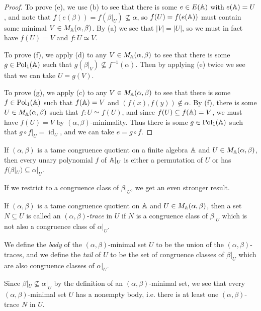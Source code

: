 \begin{appendices}
\begin{proof}
To prove (e), we use (b) to see that there is some $e \in E(\mathbb{A})$ with $e(\mathbb{A}) = U$, and note that $f(e(\beta)) = f(\beta|_U) \not\subseteq \alpha$, so $f(U) = f(e(\mathbb{A}))$ must contain some minimal $V \in M_{\mathbb{A}}(\alpha,\beta)$. By (a) we see that $|V| = |U|$, so we must in fact have $f(U) = V$ and $f : U \simeq V$.

To prove (f), we apply (d) to any $V \in M_{\mathbb{A}}(\alpha, \beta)$ to see that there is some $g \in \operatorname{Pol}_1(\mathbb{A})$ such that $g(\beta|_V) \not\subseteq f^{-1}(\alpha)$. Then by applying (e) twice we see that we can take $U = g(V)$.

To prove (g), we apply (c) to any $V \in M_{\mathbb{A}}(\alpha, \beta)$ to see that there is some $f \in \operatorname{Pol}_1(\mathbb{A})$ such that $f(\mathbb{A}) = V$ and $(f(x), f(y)) \not\in \alpha$. By (f), there is some $U \in M_{\mathbb{A}}(\alpha, \beta)$ such that $f : U \simeq f(U)$, and since $f(U) \subseteq f(\mathbb{A}) = V$, we must have $f(U) = V$ by $(\alpha,\beta)$-minimality. Thus there is some $g \in \operatorname{Pol}_1(\mathbb{A})$ such that $g\circ f|_U = \operatorname{id}_U$, and we can take $e = g \circ f$.
\end{proof}

\begin{cor} If $(\alpha,\beta)$ is a tame congruence quotient on a finite algebra $\mathbb{A}$ and $U \in M_{\mathbb{A}}(\alpha,\beta)$, then every unary polynomial $f$ of $\mathbb{A}|_U$ is either a permutation of $U$ or has $f(\beta|_U) \subseteq \alpha|_U$.
\end{cor}

If we restrict to a congruence class of $\beta|_U$, we get an even stronger result.

\begin{defn} If $(\alpha,\beta)$ is a tame congruence quotient on $\mathbb{A}$ and $U \in M_{\mathbb{A}}(\alpha,\beta)$, then a set $N \subseteq U$ is called an $(\alpha,\beta)$-\emph{trace} in $U$ if $N$ is a congruence class of $\beta|_U$ which is not also a congruence class of $\alpha|_U$.

We define the \emph{body} of the $(\alpha,\beta)$-minimal set $U$ to be the union of the $(\alpha,\beta)$-traces, and we define the \emph{tail} of $U$ to be the set of congruence classes of $\beta|_U$ which are also congruence classes of $\alpha|_U$.
\end{defn}

Since $\beta|_U \not\subseteq \alpha|_U$ by the definition of an $(\alpha,\beta)$-minimal set, we see that every $(\alpha,\beta)$-minimal set $U$ has a nonempty body, i.e. there is at least one $(\alpha,\beta)$-trace $N$ in $U$.


\end{appendices}
